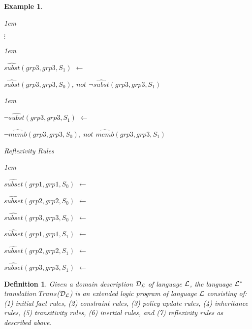 \documentclass[11pt]{report}
\newtheorem{vdefinition}{Definition}[chapter]
\newtheorem{vexample}{Example}[chapter]
\newenvironment{vquote}
{
  \begin{list}{}{\leftmargin 1em}\item[]
}
{
  \end{list}
}
\begin{document}
\begin{vexample}
\begin{enumerate}
                \begin{vquote}
                  \hspace{2em}$\vdots$
                \end{vquote}
            
                \begin{vquote}
                  $\hat{subst}(grp3, grp3, S_{1})$ $\leftarrow$
            
                  \hspace{1em}
                  $\hat{subst}(grp3, grp3, S_{0})$,
                  $not$ $\lnot\hat{subst}(grp3, grp3, S_{1})$
                \end{vquote}
            
                \begin{vquote}
                  $\lnot\hat{subst}(grp3, grp3, S_{1})$ $\leftarrow$
            
                  \hspace{1em}
                  $\lnot\hat{memb}(grp3, grp3, S_{0})$,
                  $not$ $\hat{memb}(grp3, grp3, S_{1})$
                \end{vquote}

              \item
                Reflexivity Rules

                \begin{vquote}
                  $\hat{subset}(grp1, grp1, S_{0})$ $\leftarrow$
                  
                  $\hat{subset}(grp2, grp2, S_{0})$ $\leftarrow$
                  
                  $\hat{subset}(grp3, grp3, S_{0})$ $\leftarrow$
                  
                  $\hat{subset}(grp1, grp1, S_{1})$ $\leftarrow$
                  
                  $\hat{subset}(grp2, grp2, S_{1})$ $\leftarrow$
                  
                  $\hat{subset}(grp3, grp3, S_{1})$ $\leftarrow$
               \end{vquote}
            \end{enumerate}
          \end{vexample}

          \begin{vdefinition}
            \label{def-langl-trans}
            Given a domain description ${\cal D_{L}}$ of language ${\cal L}$,
            the language ${\cal L^{*}}$ translation $Trans$(${\cal D_{L}}$)
            is an extended logic program of language ${\cal L}$ consisting of:
            (1) initial fact rules, (2) constraint rules, (3) policy update
            rules, (4) inheritance rules, (5) transitivity rules, (6) inertial
            rules, and (7) reflexivity rules as described above.
          \end{vdefinition}
\end{document}
